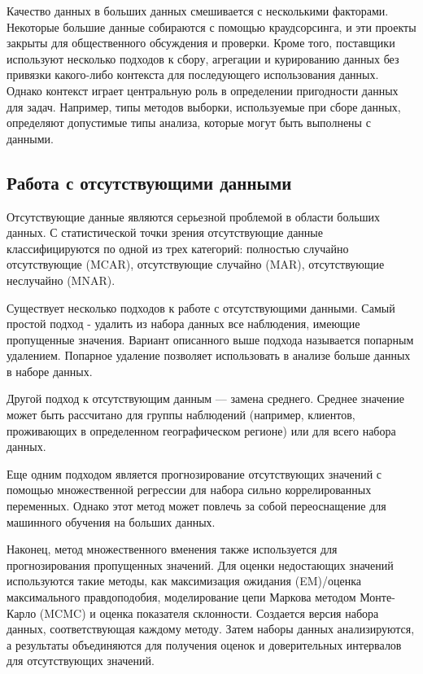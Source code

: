 \documentclass{article}
\begin{document}
Качество данных в больших данных смешивается с несколькими факторами. Некоторые большие данные собираются с помощью краудсорсинга, и эти проекты закрыты для общественного обсуждения и проверки. Кроме того, поставщики используют несколько подходов к сбору, агрегации и курированию данных без привязки какого-либо контекста для последующего использования данных. Однако контекст играет центральную роль в определении пригодности данных для задач. Например, типы методов выборки, используемые при сборе данных, определяют допустимые типы анализа, которые могут быть выполнены с данными.

\subsection{Работа с отсутствующими данными}

Отсутствующие данные являются серьезной проблемой в области больших данных. С статистической точки зрения отсутствующие данные классифицируются по одной из трех категорий: полностью случайно отсутствующие (MCAR), отсутствующие случайно (MAR), отсутствующие неслучайно (MNAR). 

Существует несколько подходов к работе с отсутствующими данными. Самый простой подход - удалить из набора данных все наблюдения, имеющие пропущенные значения. Вариант описанного выше подхода называется попарным удалением. Попарное удаление позволяет использовать в анализе больше данных в наборе данных. 

Другой подход к отсутствующим данным — замена среднего. Среднее значение может быть рассчитано для группы наблюдений (например, клиентов, проживающих в определенном географическом регионе) или для всего набора данных. 

Еще одним подходом является прогнозирование отсутствующих значений с помощью множественной регрессии для набора сильно коррелированных переменных. Однако этот метод может повлечь за собой переоснащение для машинного обучения на больших данных. 

Наконец, метод множественного вменения также используется для прогнозирования пропущенных значений. Для оценки недостающих значений используются такие методы, как максимизация ожидания (EM)/оценка максимального правдоподобия, моделирование цепи Маркова методом Монте-Карло (MCMC) и оценка показателя склонности. Создается версия набора данных, соответствующая каждому методу. Затем наборы данных анализируются, а результаты объединяются для получения оценок и доверительных интервалов для отсутствующих значений.
\end{document}
